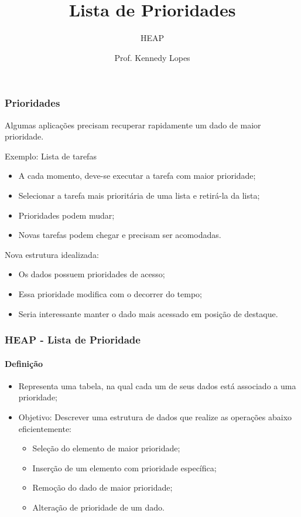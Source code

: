 \documentclass[10pt]{beamer}
\title{Lista de Prioridades}
\subtitle{HEAP}
\institute[UFERSA]{Universidade Federal do Semi-árido}
\author{Prof. Kennedy Lopes}
\begin{document}
\frame{\titlepage}
\frame{\tableofcontents}


\begin{frame}
    \frametitle{Prioridades}

    \large
    Algumas aplicações precisam recuperar rapidamente um dado de maior prioridade.\vfill

    Exemplo: Lista de tarefas\vfill
    \begin{itemize}[<+-|alert@+>]
        \color{cinza}
        \item A cada momento, deve-se executar a tarefa com maior prioridade;
        \item Selecionar a tarefa mais prioritária de uma lista e retirá-la da lista;
        \item Prioridades podem mudar;
        \item Novas tarefas podem chegar e precisam ser acomodadas.
    \end{itemize}\vfill

    \only<+-> {Nova estrutura idealizada:\vfill}
    \begin{itemize}[<+-|alert@+>]
        \color{cinza}
        \item Os dados possuem prioridades de acesso;\vfill
        \item Essa prioridade modifica com o decorrer do tempo;\vfill
        \item Seria interessante manter o dado mais acessado em posição de destaque.
    \end{itemize}

\end{frame}


\begin{frame}
    \frametitle{HEAP - Lista de Prioridade}
    \framesubtitle{Definição}
    \large
    \begin{itemize}[<+->]\setlength{\itemsep}{\fill}
        \item Representa uma tabela, na qual cada um de seus dados está associado a uma prioridade;
        \item Objetivo: Descrever uma estrutura de dados que realize as operações abaixo eficientemente:
              \begin{itemize}\setlength{\itemsep}{\fill}\large
                  \item Seleção do elemento de maior prioridade;
                  \item Inserção de um elemento com prioridade específica;
                  \item Remoção do dado de maior prioridade;
                  \item Alteração de prioridade de um dado.
              \end{itemize}
    \end{itemize}
\end{frame}
\end{document}
